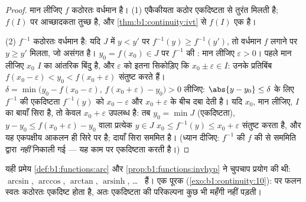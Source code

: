\begin{proof}
मान लीजिए $f$ कठोरतः वर्धमान है। (1) एकैकीयता कठोर एकदिष्टता से तुरंत मिलती
है; $f(I)$ पर आच्छादकता तुच्छ है, और \cref{thm:b1:continuity:ivt} से $f(I)$
एक  है।

(2) $f^{-1}$ कठोरतः वर्धमान है: यदि $J$ में $y < y'$ पर $f^{-1}(y) \geq
f^{-1}(y')$, तो वर्धमान $f$ लगाने पर $y \geq y'$ मिलता, जो असंगत है। $y_0 =
f(x_0) \in J$ पर $f^{-1}$ की : मान लीजिए $\varepsilon > 0$। पहले मान
लीजिए $x_0$ $I$ का आंतरिक बिंदु है, और $\varepsilon$ को इतना सिकोड़िए कि
$x_0 \pm \varepsilon \in I$: उनके प्रतिबिंब $f(x_0 - \varepsilon) < y_0 <
f(x_0 + \varepsilon)$ संतुष्ट करते हैं। $\delta = \min\bigl(y_0 - f(x_0 -
\varepsilon),\, f(x_0 + \varepsilon) - y_0\bigr) > 0$ लीजिए: $\abs{y - y_0}
\leq \delta$ के लिए $f^{-1}$ की एकदिष्टता $f^{-1}(y)$ को $x_0 - \varepsilon$
और $x_0 + \varepsilon$ के बीच दबा देती है। यदि $x_0$, मान लीजिए, $I$ का
बायाँ सिरा है, तो केवल $x_0 + \varepsilon$ उपलब्ध है: तब $y_0 = \min J$
(एकदिष्टता), $y - y_0 \leq f(x_0 + \varepsilon) - y_0$ वाला प्रत्येक $y \in
J$ $x_0 \leq f^{-1}(y) \leq x_0 + \varepsilon$ संतुष्ट करता है, और यह
एकपक्षीय आकलन ही सिरे पर  है; दायाँ सिरा सममित है। (ध्यान दीजिए:
$f^{-1}$ की  $f$ की  से सममिति द्वारा \emph{नहीं} निकाली गई
--- यह काम  पर एकदिष्टता करती है।)
\end{proof}

\begin{remark}
यही प्रमेय \cref{def:b1:functions:arc} और \cref{prop:b1:functions:invhyp} ने
चुपचाप प्रयोग की थी: $\arcsin$, $\arccos$, $\arctan$,
$\operatorname{arsinh}$, \dots\  हैं। एक पूरक
(\cref{exo:b1:continuity:10}):  पर  \emph{} फलन स्वतः कठोरतः
एकदिष्ट होता है, अतः एकदिष्टता की परिकल्पना कुछ भी महँगी नहीं पड़ती।
\end{remark}

